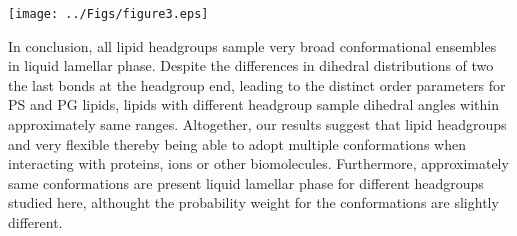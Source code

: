 \documentclass[aps,prl,superscriptaddress,twocolumn]{revtex4}
\begin{document}

\begin{figure*}[bt]
  \centering
  \texttt{[image: ../Figs/figure3.eps]}
  \caption{\label{changesWITHsurf}
    {\bf A)} Modulation of PC headgroup order parameters and P-N vector angle upon addition of cationic surfactant
    from CHARMM36 simulations compared with experimental data \cite{??}.
    {\bf B)} Changes in PC headgroup conformational ensembles upon increasing amount of positive charge in bilayer,
    characterized by the heavy atom dihedral distributions, from CHARMM36 simulations.
  }
\end{figure*}


In conclusion, all lipid headgroups sample very broad conformational ensembles in liquid lamellar phase.
Despite the differences in dihedral distributions of two the last bonds at the headgroup end,
leading to the distinct order parameters for PS and PG lipids,
lipids with different headgroup sample dihedral angles within approximately same ranges.
Altogether, our results suggest that lipid headgroups and very flexible thereby being
able to adopt multiple conformations when interacting with proteins, ions or other biomolecules.
Furthermore, approximately same conformations are present liquid lamellar phase for different
headgroups studied here, althought the probability weight for the conformations are slightly different.
\end{document}
